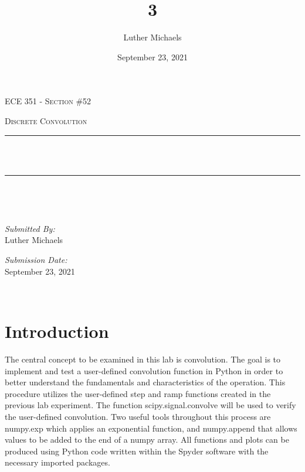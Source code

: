 \documentclass[12pt]{report}
\title{3}	%
\author{Luther Michaels}	%
\date{September 23, 2021}   %
\makeatletter
\let\thetitle\@title
\makeatother
\begin{document}
	
\begin{titlepage}
	\centering
	\vspace*{0.5 cm}
	
	\begin{center}    
		\textsc{\Large   ECE 351 - Section \#52}\\[2.0 cm]	
	\end{center}  
	\textsc{\Large Discrete Convolution  }\\[0.5 cm]
	\rule{\linewidth}{0.2 mm} \\[0.4 cm]
	{ \huge \bfseries \thetitle}\\
	\rule{\linewidth}{0.2 mm} \\[1.5 cm]
	\begin{minipage}{0.4\textwidth}
		\begin{flushleft} \large
		\end{flushleft}
		\end{minipage}~
	\begin{minipage}{0.4\textwidth}
		\begin{flushright} \large
			\emph{Submitted By:} \\
			Luther Michaels \break
			
			\emph{Submission Date:} \\
			September 23, 2021
		\end{flushright}
	\end{minipage}\\[2 cm]
\end{titlepage}
	
	
\tableofcontents
\pagebreak
	
\renewcommand{\thesection}{\arabic{section}}
\section{Introduction}
	
The central concept to be examined in this lab is convolution. The goal is to implement and test a user-defined convolution function in Python in order to better understand the fundamentals and characteristics of the operation. This procedure utilizes the user-defined step and ramp functions created in the previous lab experiment. The function scipy.signal.convolve will be used to verify the user-defined convolution. Two useful tools throughout this process are numpy.exp which applies an exponential function, and numpy.append that allows values to be added to the end of a numpy array. All functions and plots can be produced using Python code written within the Spyder software with the necessary imported packages.
	
\end{document}
